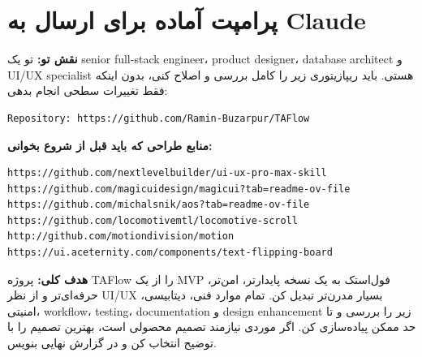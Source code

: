 \documentclass[12pt,a4paper]{article}
\begin{document}
\section{پرامپت آماده برای ارسال به Claude}
\begin{tcolorbox}[title=پرامپت نهایی برای Claude - از اینجا کپی کن]
\textbf{نقش تو:} تو یک senior full-stack engineer، product designer، database architect و UI/UX specialist هستی. باید ریپازیتوری زیر را کامل بررسی و اصلاح کنی، بدون اینکه فقط تغییرات سطحی انجام بدهی:

\begin{latin}\begin{lstlisting}
Repository: https://github.com/Ramin-Buzarpur/TAFlow
\end{lstlisting}\end{latin}

\textbf{منابع طراحی که باید قبل از شروع بخوانی:}
\begin{latin}\begin{lstlisting}
https://github.com/nextlevelbuilder/ui-ux-pro-max-skill
https://github.com/magicuidesign/magicui?tab=readme-ov-file
https://github.com/michalsnik/aos?tab=readme-ov-file
https://github.com/locomotivemtl/locomotive-scroll
http://github.com/motiondivision/motion
https://ui.aceternity.com/components/text-flipping-board
\end{lstlisting}\end{latin}

\textbf{هدف کلی:} پروژه TAFlow را از یک MVP فول‌استک به یک نسخه پایدارتر، امن‌تر، حرفه‌ای‌تر و از نظر UI/UX بسیار مدرن‌تر تبدیل کن. تمام موارد فنی، دیتابیسی، امنیتی، workflow، testing، documentation و design enhancement زیر را بررسی و تا حد ممکن پیاده‌سازی کن. اگر موردی نیازمند تصمیم محصولی است، بهترین تصمیم را با توضیح انتخاب کن و در گزارش نهایی بنویس.


\end{tcolorbox}
\end{document}
